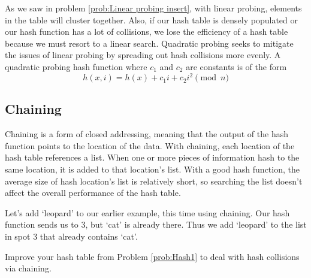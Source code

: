 As we saw in problem \ref{prob:Linear probing insert}, with linear probing, elements in the table will cluster together.
Also, if our hash table is densely populated or our hash function has a lot of collisions, we lose the efficiency of a hash table because we must resort to a linear search.
Quadratic probing seeks to mitigate the issues of linear probing by spreading out hash collisions more evenly.
A quadratic probing hash function where $c_1$ and $c_2$ are constants is of the form
\begin{equation*}
h(x, i) = h(x) + c_1i + c_2i^2 \pmod{n}
\end{equation*}

\subsection*{Chaining}
Chaining is a form of closed addressing, meaning that the output of the hash function points to the location of the data.
With chaining, each location of the hash table references a list.
When one or more pieces of information hash to the same location, it is added to that location's list.
With a good hash function, the average size of hash location's list is relatively short, so searching the list doesn't affect the overall performance of the hash table.

Let's add `leopard' to our earlier example, this time using chaining.
Our hash function sends us to 3, but `cat' is already there.
Thus we add `leopard' to the list in spot 3 that already contains `cat'.
\begin{center}
\end{center}

\begin{problem}
Improve your hash table from Problem \ref{prob:Hash1} to deal with hash collisions via chaining.
\label{prob:Chaining insert}
\end{problem}

